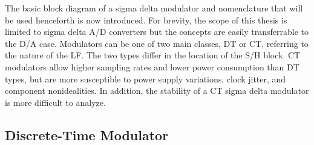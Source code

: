 The basic block diagram of a sigma delta modulator and nomenclature that will be used henceforth is now introduced. For brevity, the scope of this thesis is limited to sigma delta \gls{A/D} converters but the concepts are easily transferrable to the \gls{D/A} case. Modulators can be one of two main classes, \gls{DT} or \gls{CT}, referring to the nature of the \gls{LF}. The two types differ in the location of the \gls{S/H} block. \gls{CT} modulators allow higher sampling rates and lower power consumption than \gls{DT} types, but are more susceptible to power supply variations, clock jitter, and component nonidealities. In addition, the stability of a \gls{CT} sigma delta modulator is more difficult to analyze.

\subsection{Discrete-Time Modulator}
\label{sec:in-dtm}

